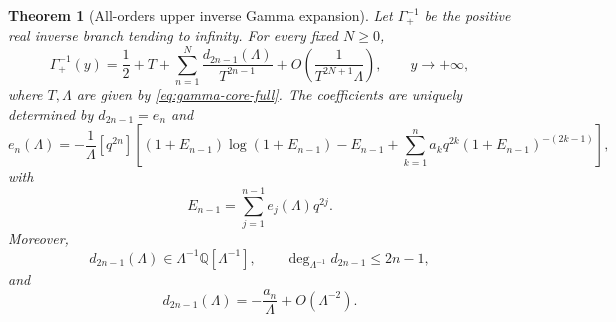 \documentclass[11pt,oneside]{article}
\theoremstyle{plain}
\newtheorem{theorem}{Theorem}[section]
\theoremstyle{definition}
\theoremstyle{remark}
\newcommand{\Q}{\mathbb{Q}}
\newcommand{\coeff}[2]{\left[#1^{#2}\right]}
\begin{document}
\begin{theorem}[All-orders upper inverse Gamma expansion]
\label{thm:gamma-all-orders}
Let \(\Gamma_+^{-1}\) be the positive real inverse branch tending to infinity.
For every fixed \(N\ge0\),
\begin{equation}
 \Gamma_+^{-1}(y)
 =\frac12+T+\sum_{n=1}^{N}
 \frac{d_{2n-1}(\Lambda)}{T^{2n-1}}
 +O\!\left(\frac{1}{T^{2N+1}\Lambda}\right),
 \qquad y\to+\infty,
 \label{eq:gamma-all-orders}
\end{equation}
where \(T,\Lambda\) are given by \cref{eq:gamma-core-full}.  The coefficients
are uniquely determined by \(d_{2n-1}=e_n\) and
\begin{equation}
 e_n(\Lambda)=-\frac1\Lambda\coeff{q}{2n}
 \left[
 (1+E_{n-1})\log(1+E_{n-1})-E_{n-1}
 +\sum_{k=1}^{n}a_kq^{2k}
  (1+E_{n-1})^{-(2k-1)}
 \right],
 \label{eq:gamma-recurrence}
\end{equation}
with
\begin{equation}
 E_{n-1}=\sum_{j=1}^{n-1}e_j(\Lambda)q^{2j}.
 \label{eq:gamma-trunc-epsilon}
\end{equation}
Moreover,
\begin{equation}
 d_{2n-1}(\Lambda)
 \in \Lambda^{-1}\Q[\Lambda^{-1}],
 \qquad
 \deg_{\Lambda^{-1}}d_{2n-1}\le2n-1,
 \label{eq:gamma-coefficient-ring}
\end{equation}
and
\begin{equation}
 d_{2n-1}(\Lambda)=-\frac{a_n}{\Lambda}
 +O(\Lambda^{-2}).
 \label{eq:gamma-leading-block}
\end{equation}
\end{theorem}
\end{document}
